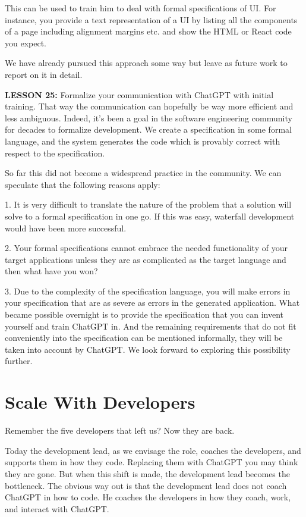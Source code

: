 \documentclass[runningheads]{llncs}
\begin{document}
This can be used to train him to deal with formal specifications of UI. For instance, you provide a text representation of a UI by listing all the components of a page including alignment margins etc. and show the HTML or React code you expect.

We have already pursued this approach some way but leave as future work to report on it in detail.

\textbf{LESSON 25:} Formalize your communication with ChatGPT with initial training. That way the communication can hopefully be way more efficient and less ambiguous.
Indeed, it's been a goal in the software engineering community for decades to formalize development. We create a specification in some formal language, and the system generates the code which is provably correct with respect to the specification.

So far this did not become a widespread practice in the community. We can speculate that the following reasons apply:

1. It is very difficult to translate the nature of the problem that a solution will solve to a formal specification in one go. If this was easy, waterfall development would have been more successful.

2. Your formal specifications cannot embrace the needed functionality of your target applications unless they are as complicated as the target language and then what have you won?

3. Due to the complexity of the specification language, you will make errors in your specification that are as severe as errors in the generated application.
What became possible overnight is to provide the specification that you can invent yourself and train ChatGPT in. And the remaining requirements that do not fit conveniently into the specification can be mentioned informally, they will be taken into account by ChatGPT. We look forward to exploring this possibility further.
  
\section{Scale With Developers}
Remember the five developers that left us? Now they are back.

Today the development lead, as we envisage the role, coaches the developers, and supports them in how they code. Replacing them with ChatGPT you may think they are gone.
But when this shift is made, the development lead becomes the bottleneck. The obvious way out is that the development lead does not coach ChatGPT in how to code. He 
coaches the developers in how they coach, work, and interact with ChatGPT.
\end{document}
